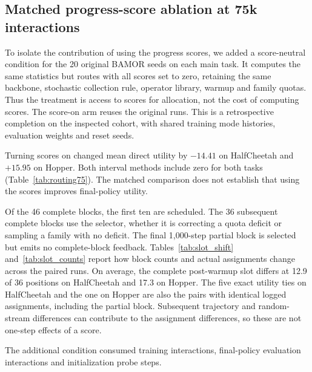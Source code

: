 \subsection{Matched progress-score ablation at 75k interactions}
\label{sec:routing75}

To isolate the contribution of using the progress scores, we added
a score-neutral condition for the 20 original BAMOR seeds on each
main task. It computes the same statistics but routes with all scores
set to zero, retaining the same backbone, stochastic collection
rule, operator library, warmup and family quotas. Thus the treatment
is access to scores for allocation, not the cost of computing scores.
The score-on arm reuses the original runs. This is a retrospective
completion on the inspected cohort, with shared training mode histories,
evaluation weights and reset seeds.

Turning scores on changed mean direct utility by $-14.41$ on HalfCheetah
and $+15.95$ on Hopper. Both interval methods include zero for both tasks
(Table~\ref{tab:routing75}). The matched comparison does not establish
that using the scores improves final-policy utility.



Of the 46 complete blocks, the first ten are scheduled. The 36
subsequent complete blocks use the selector, whether it is correcting a
quota deficit or sampling a family with no deficit. The final 1,000-step
partial block is selected but emits no complete-block feedback.
Tables~\ref{tab:slot_shift} and~\ref{tab:slot_counts} report how block
counts and actual assignments change across the paired runs. On average,
the complete post-warmup slot differs at 12.9 of 36 positions on
HalfCheetah and 17.3 on Hopper. The five exact utility ties on HalfCheetah
and the one on Hopper are also the pairs with identical logged
assignments, including the partial block. Subsequent trajectory and
random-stream differences can contribute to the assignment differences,
so these are not one-step effects of a score.


The additional condition consumed \NcaTrainingInteractions{} training
interactions, \NcaEvaluationInteractions{} final-policy evaluation
interactions and \NcaEnvironmentInitializationProbeSteps{} initialization
probe steps.
\FloatBarrier
